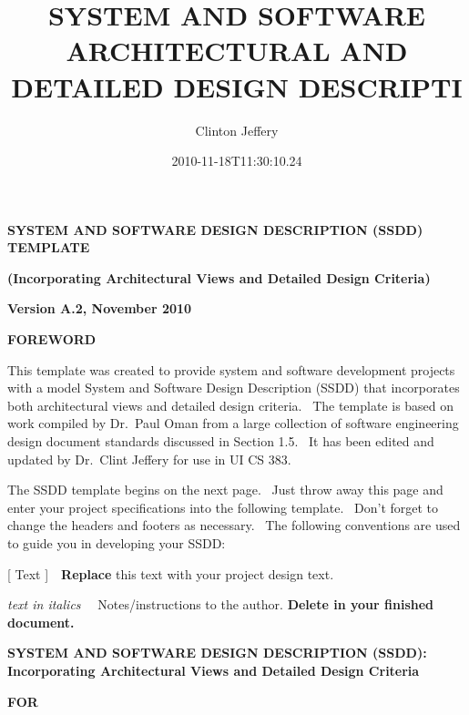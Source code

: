 \documentclass[twoside,letterpaper]{article}
\title{SYSTEM AND SOFTWARE ARCHITECTURAL AND DETAILED DESIGN DESCRIPTI}
\author{Clinton Jeffery}
\date{2010-11-18T11:30:10.24}
\begin{document}
\clearpage\setcounter{page}{1}\pagestyle{Standard}
\thispagestyle{FirstPage}
{\centering{}\bfseries\color{black}
SYSTEM AND SOFTWARE\newline
DESIGN DESCRIPTION (SSDD) TEMPLATE
\par}

{\centering{}\bfseries\color{black}
(Incorporating Architectural Views and Detailed Design Criteria)
\par}

{\centering{}\bfseries\color{black}
Version A.2, November 2010
\par}

{\centering{}\bfseries\color{black}
FOREWORD
\par}

{\color{black}
This template was created to provide system and software development
projects with a model System and Software Design Description (SSDD)
that incorporates both architectural views and detailed design
criteria. \ The template is based on work compiled by Dr.~Paul Oman
from a large collection of software engineering design document
standards discussed in Section 1.5. \ It has been edited and updated by
Dr.~Clint Jeffery for use in UI CS 383.}

{\color{black}
The SSDD template begins on the next page. \ Just throw away this page
and enter your project specifications into the following template.
\ Don{\textquoteright}t forget to change the headers and footers as
necessary. \ The following conventions are used to guide you in
developing your SSDD:}

{\color{black}
{[ Text
]\ \ }{\textbf{Replace}}{
this text with your project design text.}}

{\color{black}
{\textit{text
in italics }}{\ \ Notes/instructions to the
author. }{\textbf{Delete in your finished
document.}}}


\bigskip

\clearpage

{\centering{}\bfseries\color{black}
SYSTEM AND SOFTWARE DESIGN DESCRIPTION (SSDD): Incorporating
Architectural Views and Detailed Design Criteria
\par}

{\centering{}\bfseries\color{black}
FOR
\par}
\end{document}
